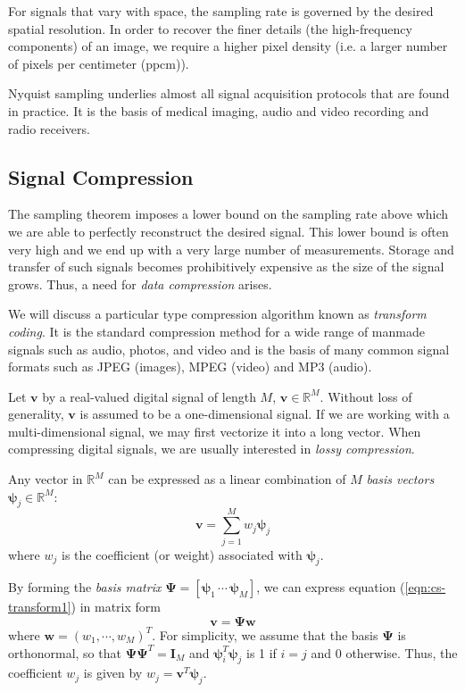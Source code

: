 For signals that vary with space, the sampling rate is governed by the desired spatial resolution.
In order to recover the finer details (the high-frequency components) of an image, we require a higher pixel density (i.e. a larger number of pixels per centimeter (ppcm)).

Nyquist sampling underlies almost all signal acquisition protocols that are found in practice. 
It is the basis of medical imaging, audio and video recording and radio receivers.

\subsection{Signal Compression}
\label{sect:compression}
The sampling theorem imposes a lower bound on the sampling rate above which we are able to perfectly reconstruct the desired signal.
This lower bound is often very high and we end up with a very large number of measurements.
Storage and transfer of such signals becomes prohibitively expensive as the size of the signal grows.
Thus, a need for \emph{data compression} arises.

We will discuss a particular type compression algorithm known as \emph{transform coding}.
It is the standard compression method for a wide range of manmade signals such as audio, photos, and video and is the basis of many common signal formats such as JPEG (images), MPEG (video) and MP3 (audio).

Let $\bm v$ by a real-valued digital signal of length $M$, $\bm v \in \mathbb{R}^M$.
Without loss of generality, $\bm v$ is assumed to be a one-dimensional signal.
If we are working with a multi-dimensional signal, we may first vectorize it into a long vector.
When compressing digital signals, we are usually interested in \emph{lossy compression}.

Any vector in $\mathbb{R}^M$ can be expressed as a linear combination of $M$ \emph{basis vectors} $\bm\psi_j \in \mathbb{R}^M$:
\begin{equation}
\label{eqn:cs-transform1}
  \bm v = \sum_{j=1}^M w_j \bm\psi_j
\end{equation}
where $w_j$ is the coefficient (or weight) associated with $\bm\psi_j$.

By forming the \emph{basis matrix} $\bm\Psi = \left[\bm\psi_1 \,\cdots\, \bm\psi_M\right]$, we can express equation (\ref{eqn:cs-transform1}) in matrix form
\begin{equation*}
\bm v = \bm\Psi \bm w
\end{equation*}
where $\bm w = (w_1,\cdots,w_M)^T$.
For simplicity, we assume that the basis $\bm\Psi$ is orthonormal, so that $\bm\Psi\bm\Psi^T = \bm I_M$ and $\bm\psi_i^T\bm\psi_j$ is 1 if $i = j$ and 0 otherwise.
Thus, the coefficient $w_j$ is given by $w_j = \bm v^T\bm\psi_j$.

